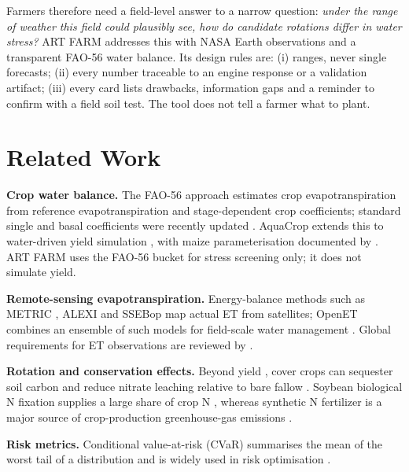 \documentclass[10pt,twocolumn]{article}
\begin{document}
Farmers therefore need a field-level answer to a narrow question: \emph{under the range of weather this field could plausibly see, how do candidate rotations differ in water stress?} ART FARM addresses this with NASA Earth observations and a transparent FAO-56 water balance. Its design rules are: (i) ranges, never single forecasts; (ii) every number traceable to an engine response or a validation artifact; (iii) every card lists drawbacks, information gaps and a reminder to confirm with a field soil test. The tool does not tell a farmer what to plant.

\section{Related Work}
\textbf{Crop water balance.} The FAO-56 approach estimates crop evapotranspiration from reference evapotranspiration and stage-dependent crop coefficients; standard single and basal coefficients were recently updated \citep{pereira2021}. AquaCrop extends this to water-driven yield simulation \citep{steduto2009,raes2009}, with maize parameterisation documented by \citet{hsiao2009}. ART FARM uses the FAO-56 bucket for stress screening only; it does not simulate yield.

\textbf{Remote-sensing evapotranspiration.} Energy-balance methods such as METRIC \citep{allen2007}, ALEXI \citep{anderson2007} and SSEBop \citep{senay2013} map actual ET from satellites; OpenET combines an ensemble of such models for field-scale water management \citep{melton2022}. Global requirements for ET observations are reviewed by \citet{fisher2017}.

\textbf{Rotation and conservation effects.} Beyond yield \citep{seifert2017,bowles2020}, cover crops can sequester soil carbon \citep{poeplau2015,lal2004} and reduce nitrate leaching relative to bare fallow \citep{tonitto2006}. Soybean biological N fixation supplies a large share of crop N \citep{salvagiotti2008}, whereas synthetic N fertilizer is a major source of crop-production greenhouse-gas emissions \citep{snyder2009}.

\textbf{Risk metrics.} Conditional value-at-risk (CVaR) summarises the mean of the worst tail of a distribution and is widely used in risk optimisation \citep{rockafellar2000}.
\end{document}
